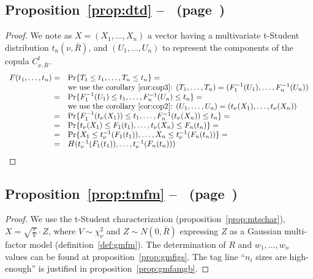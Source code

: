 \documentclass[11pt,fleqn]{book} %
\begin{document}
\subsection{Proposition~\ref{prop:dtd} --~ (page~\pageref{prop:dtd})}
\begin{proof}
	We note as $X=(X_1,\dots,X_n)$ a vector having a multivariate t-Student
	distribution $t_n(\nu,\bar{R})$, and $(U_1,\dots,U_n)$ to represent
	the components of the copula $C_{\nu,\bar{R}}^t$.
	\begin{displaymath}
		\begin{array}{rl}
			F(t_1,\dots,t_n) = & \Pr\{ T_1 \le t_1 , \dots, T_n \le t_n \} = \\
			                   & \text{we use the corollary~\ref{cor:cop3}: }
			(T_1,\dots,T_n) = (F_1^{-1}(U_1),\dots,F_n^{-1}(U_n)) \\
			=                  & \Pr\{ F_1^{-1}(U_1) \le t_1 , \dots , F_n^{-1}(U_n) \le t_n \} = \\
			                   & \text{we use the corollary~\ref{cor:cop2}: }
			(U_1,\dots,U_n) = (t_\nu(X_1),\dots,t_\nu(X_n)) \\
			=                  & \Pr\{ F_1^{-1}(t_\nu(X_1)) \le t_1 , \dots , F_n^{-1}(t_\nu(X_n)) \le t_n \} = \\
			=                  & \Pr\{ t_\nu(X_1) \le F_1(t_1), \dots , t_\nu(X_n) \le F_n(t_n) \} = \\
			=                  & \Pr\{ X_1 \le t_\nu^{-1}(F_1(t_1)), \dots , X_n \le t_\nu^{-1}(F_n(t_n)) \} = \\
			=                  & H(t_\nu^{-1}(F_1(t_1)), \dots, t_\nu^{-1}(F_n(t_n))) \\
		\end{array}
	\end{displaymath}
\end{proof}

\subsection{Proposition~\ref{prop:tmfm} --~ (page~\pageref{prop:tmfm})}
\begin{proof}
	We use the t-Student characterization (proposition~\ref{prop:mtschar}),
	$X = \sqrt{\frac{\nu}{V}} \cdot Z$, where $V \sim \chi_{\nu}^2$ and 
	$Z \sim N(0,\bar{R})$ expressing $Z$ as a Gaussian multi-factor model 
	(definition~\ref{def:gmfm}). The determination of $R$ and $w_1,\dots,w_n$
	values can be found at proposition~\ref{prop:gmfigs}. The tag line 
	``$n_i$ sizes are high-enough'' is justified in 
	proposition~\ref{prop:gmfamgb}.
\end{proof}
\end{document}
